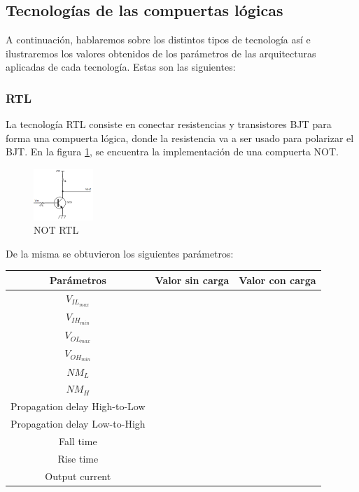 \subsection{Tecnologías de las compuertas lógicas}
A continuación, hablaremos sobre los distintos tipos de tecnología así e ilustraremos los valores obtenidos de los parámetros de las arquitecturas aplicadas de cada tecnología. Estas son las siguientes:

\subsubsection{RTL}
La tecnología RTL consiste en conectar resistencias y transistores BJT para forma una compuerta lógica, donde la resistencia va a ser usado para polarizar el BJT. En la figura \ref{fig:eje1_1}, se encuentra la implementación de una compuerta NOT.
\begin{figure}[H]
	\centering
	\includegraphics[width=0.2\textwidth]{Ejercicio1/RTL.png}
	\caption{NOT RTL}
	\label{fig:eje1_1}
\end{figure}
De la misma se obtuvieron los siguientes parámetros:
\begin{table}[H]
	\centering
	\begin{tabular}{|c|c|c|}
		\hline
		Parámetros & Valor sin carga & Valor con carga\\
		\hline
		$V_{IL_{max}}$ & & \\
		\hline
		$V_{IH_{min}}$ & & \\
		\hline
		$V_{OL_{max}}$ & & \\
		\hline
		$V_{OH_{min}}$ & & \\
		\hline
		$NM_{L}$ & & \\
		\hline
		$NM_{H}$ & & \\
		\hline
		Propagation delay High-to-Low & & \\
		\hline
		Propagation delay Low-to-High & & \\
		\hline
		Fall time & & \\
		\hline
		Rise time & & \\
		\hline
		Output current & & \\
		\hline
	\end{tabular}
\end{table}

